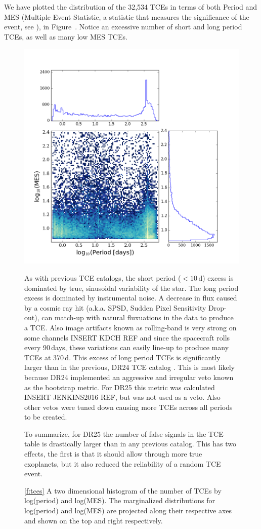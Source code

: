 We have plotted the distribution of the 32,534 TCEs in terms of both Period and MES (Multiple Event Statistic, a statistic that measures the significance of the event, see \citep{Jenkins2002a}), in Figure~\label{f:tces}. Notice an excessive number of short and long period TCEs, as well as many low MES TCEs.  

\begin{figure}
 \begin{center}
  \includegraphics[width=\linewidth]{tce-dist.png}
  \caption{\ref{f:tces} A two dimensional histogram of the number of TCEs by log(period) and log(MES). The marginalized distributions for log(period) and log(MES) are projected along their respective axes and shown on the top and right respectively. }
 \end{center}

As with previous TCE catalogs, the short period ($<10$\,d) excess is dominated by true, sinusoidal variability of the star. The long period excess is dominated by instrumental noise. A decrease in flux caused by a cosmic ray hit (a.k.a. SPSD, Sudden Pixel Sensitivity Drop-out), can match-up with natural fluxuations in the data to produce a TCE. Also image artifacts known as rolling-band is very strong on some channels INSERT KDCH REF%
and since the spacecraft rolls every 90\,days, these variations can easily line-up to produce many TCEs at 370\,d.  This excess of long period TCEs is significantly larger than in the previous, DR24 TCE catalog \citep{Seader2015}. This is most likely because DR24 implemented an aggressive and irregular veto known as the bootstrap metric.  For DR25 this metric was calculated INSERT JENKINS2016 REF, but was not used as a veto.  Also other vetos were tuned down causing more TCEs across all periods to be created.  %

To summarize, for DR25 the number of false signals in the TCE table is drastically larger than in any previous catalog. This has two effects, the first is that it should allow through more true exoplanets, but it also reduced the reliability of a random TCE event. 


\end{figure}
